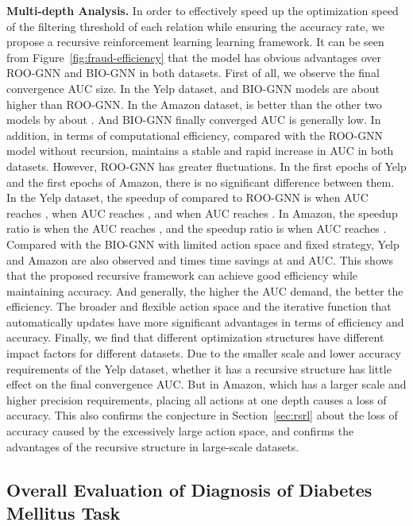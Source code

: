 \textbf{Multi-depth Analysis.}
In order to effectively speed up the optimization speed of the filtering threshold of each relation while ensuring the accuracy rate, we propose a recursive reinforcement learning learning framework. 
It can be seen from Figure~\ref{fig:fraud-efficiency} that the \RioGNN model has obvious advantages over ROO-GNN and BIO-GNN in both datasets. 
First of all, we observe the final convergence AUC size.
In the Yelp dataset, \RioGNN and BIO-GNN models are about  higher than ROO-GNN. 
In the Amazon dataset, \RioGNN is better than the other two models by about . 
And BIO-GNN finally converged AUC is generally low. 
In addition, in terms of computational efficiency, compared with the ROO-GNN model without recursion, \RioGNN maintains a stable and rapid increase in AUC in both datasets. 
However, ROO-GNN has greater fluctuations. 
In the first  epochs of Yelp and the first  epochs of Amazon, there is no significant difference between them. 
In the Yelp dataset, the speedup of \RioGNN compared to ROO-GNN is  when AUC reaches ,  when AUC reaches , and  when AUC reaches . 
In Amazon, the speedup ratio is  when the AUC reaches , and the speedup ratio is  when AUC reaches . 
Compared with the BIO-GNN with limited action space and fixed strategy, Yelp and Amazon are also observed  and  times time savings at  and  AUC. 
This shows that the proposed recursive framework can achieve good efficiency while maintaining accuracy. And generally, the higher the AUC demand, the better the efficiency. 
The broader and flexible action space and the iterative function that automatically updates have more significant advantages in terms of efficiency and accuracy. 
Finally, we find that different optimization structures have different impact factors for different datasets. 
Due to the smaller scale and lower accuracy requirements of the Yelp dataset, whether it has a recursive structure has little effect on the final convergence AUC. 
But in Amazon, which has a larger scale and higher precision requirements, placing all actions at one depth causes a loss of accuracy. 
This also confirms the conjecture in Section~\ref{sec:rsrl} about the loss of accuracy caused by the excessively large action space, and confirms the advantages of the recursive structure in large-scale datasets.







\subsection{Overall Evaluation of Diagnosis of Diabetes Mellitus Task}\label{sec:diabetes-overall}

